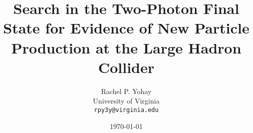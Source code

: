 \documentclass[12pt, letterpaper]{report}
\begin{document}
\title{Search in the Two-Photon Final State for Evidence of New Particle Production at the Large Hadron Collider}
\author{Rachel P. Yohay \\
	University of Virginia \\
	\texttt{rpy3y@virginia.edu}}
\date{\today}
\maketitle

\tableofcontents

%

%



%

%



%

%

%
\end{document}
